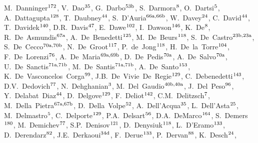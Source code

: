 \begin{flushleft}
M.~Danninger$^\textrm{\scriptsize 172}$,    
V.~Dao$^\textrm{\scriptsize 35}$,    
G.~Darbo$^\textrm{\scriptsize 53b}$,    
S.~Darmora$^\textrm{\scriptsize 8}$,    
O.~Dartsi$^\textrm{\scriptsize 5}$,    
A.~Dattagupta$^\textrm{\scriptsize 128}$,    
T.~Daubney$^\textrm{\scriptsize 44}$,    
S.~D'Auria$^\textrm{\scriptsize 66a,66b}$,    
W.~Davey$^\textrm{\scriptsize 24}$,    
C.~David$^\textrm{\scriptsize 44}$,    
T.~Davidek$^\textrm{\scriptsize 140}$,    
D.R.~Davis$^\textrm{\scriptsize 47}$,    
E.~Dawe$^\textrm{\scriptsize 102}$,    
I.~Dawson$^\textrm{\scriptsize 146}$,    
K.~De$^\textrm{\scriptsize 8}$,    
R.~De~Asmundis$^\textrm{\scriptsize 67a}$,    
A.~De~Benedetti$^\textrm{\scriptsize 125}$,    
M.~De~Beurs$^\textrm{\scriptsize 118}$,    
S.~De~Castro$^\textrm{\scriptsize 23b,23a}$,    
S.~De~Cecco$^\textrm{\scriptsize 70a,70b}$,    
N.~De~Groot$^\textrm{\scriptsize 117}$,    
P.~de~Jong$^\textrm{\scriptsize 118}$,    
H.~De~la~Torre$^\textrm{\scriptsize 104}$,    
F.~De~Lorenzi$^\textrm{\scriptsize 76}$,    
A.~De~Maria$^\textrm{\scriptsize 69a,69b}$,    
D.~De~Pedis$^\textrm{\scriptsize 70a}$,    
A.~De~Salvo$^\textrm{\scriptsize 70a}$,    
U.~De~Sanctis$^\textrm{\scriptsize 71a,71b}$,    
M.~De~Santis$^\textrm{\scriptsize 71a,71b}$,    
A.~De~Santo$^\textrm{\scriptsize 153}$,    
K.~De~Vasconcelos~Corga$^\textrm{\scriptsize 99}$,    
J.B.~De~Vivie~De~Regie$^\textrm{\scriptsize 129}$,    
C.~Debenedetti$^\textrm{\scriptsize 143}$,    
D.V.~Dedovich$^\textrm{\scriptsize 77}$,    
N.~Dehghanian$^\textrm{\scriptsize 3}$,    
M.~Del~Gaudio$^\textrm{\scriptsize 40b,40a}$,    
J.~Del~Peso$^\textrm{\scriptsize 96}$,    
Y.~Delabat~Diaz$^\textrm{\scriptsize 44}$,    
D.~Delgove$^\textrm{\scriptsize 129}$,    
F.~Deliot$^\textrm{\scriptsize 142}$,    
C.M.~Delitzsch$^\textrm{\scriptsize 7}$,    
M.~Della~Pietra$^\textrm{\scriptsize 67a,67b}$,    
D.~Della~Volpe$^\textrm{\scriptsize 52}$,    
A.~Dell'Acqua$^\textrm{\scriptsize 35}$,    
L.~Dell'Asta$^\textrm{\scriptsize 25}$,    
M.~Delmastro$^\textrm{\scriptsize 5}$,    
C.~Delporte$^\textrm{\scriptsize 129}$,    
P.A.~Delsart$^\textrm{\scriptsize 56}$,    
D.A.~DeMarco$^\textrm{\scriptsize 164}$,    
S.~Demers$^\textrm{\scriptsize 180}$,    
M.~Demichev$^\textrm{\scriptsize 77}$,    
S.P.~Denisov$^\textrm{\scriptsize 121}$,    
D.~Denysiuk$^\textrm{\scriptsize 118}$,    
L.~D'Eramo$^\textrm{\scriptsize 133}$,    
D.~Derendarz$^\textrm{\scriptsize 82}$,    
J.E.~Derkaoui$^\textrm{\scriptsize 34d}$,    
F.~Derue$^\textrm{\scriptsize 133}$,    
P.~Dervan$^\textrm{\scriptsize 88}$,    
K.~Desch$^\textrm{\scriptsize 24}$,    

\end{flushleft}
